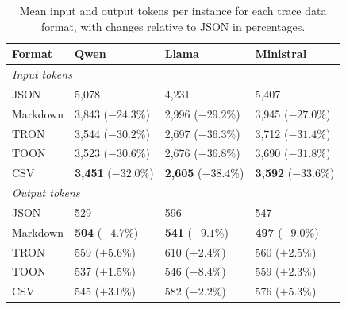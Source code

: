 \begin{table}[t]
\centering
\caption{Mean input and output tokens per instance for each trace data format, with changes relative to JSON in percentages.}
\label{tab:rq2_tokens}
\begin{tabularx}{\columnwidth}{lXXX}
\toprule
Format & Qwen & Llama & Ministral \\
\midrule
\multicolumn{4}{l}{\textit{Input tokens}} \\
JSON & 5,078 & 4,231 & 5,407 \\
Markdown & 3,843 ($-24.3$\%) & 2,996 ($-29.2$\%) & 3,945 ($-27.0$\%) \\
TRON & 3,544 ($-30.2$\%) & 2,697 ($-36.3$\%) & 3,712 ($-31.4$\%) \\
TOON & 3,523 ($-30.6$\%) & 2,676 ($-36.8$\%) & 3,690 ($-31.8$\%) \\
CSV & \textbf{3,451} ($-32.0$\%) & \textbf{2,605} ($-38.4$\%) & \textbf{3,592} ($-33.6$\%) \\
\midrule
\multicolumn{4}{l}{\textit{Output tokens}} \\
JSON & 529 & 596 & 547 \\
Markdown & \textbf{504} ($-4.7$\%) & \textbf{541} ($-9.1$\%) & \textbf{497} ($-9.0$\%) \\
TRON & 559 ($+5.6$\%) & 610 ($+2.4$\%) & 560 ($+2.5$\%) \\
TOON & 537 ($+1.5$\%) & 546 ($-8.4$\%) & 559 ($+2.3$\%) \\
CSV & 545 ($+3.0$\%) & 582 ($-2.2$\%) & 576 ($+5.3$\%) \\
\bottomrule
\end{tabularx}
\end{table}
